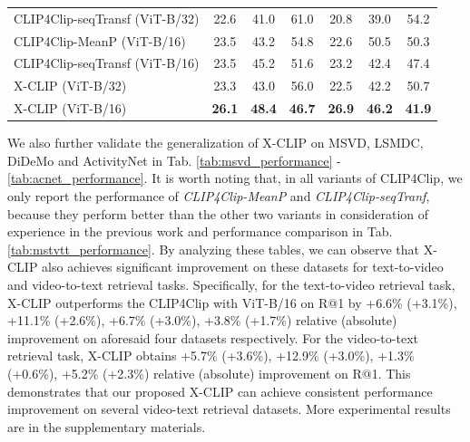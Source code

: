 \documentclass[sigconf]{acmart}
\begin{document}
\begin{table}[]
{\begin{tabular}{l|ccc|ccc}
 CLIP4Clip-seqTransf (ViT-B/32)  \cite{luo2021clip4clip} & 22.6 & 41.0 & 61.0 & 20.8 & 39.0 & 54.2 \\
CLIP4Clip-MeanP (ViT-B/16) \cite{luo2021clip4clip} & 23.5          & 43.2          & 54.8          & 22.6          & 50.5          & 50.3          \\ 
CLIP4Clip-seqTransf (ViT-B/16) \cite{luo2021clip4clip} & 23.5          & 45.2          & 51.6          & 23.2          & 42.4          & 47.4          \\ 
\hline
X-CLIP (ViT-B/32)    & 23.3          & 43.0          & 56.0          & 22.5          & 42.2          & 50.7          \\
X-CLIP (ViT-B/16)    & \textbf{26.1} & \textbf{48.4} & \textbf{46.7} & \textbf{26.9} & \textbf{46.2} & \textbf{41.9} \\ \hline
\end{tabular}
}
\vspace{-0.2cm}
\label{tab:lsmdc_performance}
\end{table}

We also further validate the generalization of X-CLIP on MSVD, LSMDC, DiDeMo and ActivityNet in Tab. \ref{tab:msvd_performance} - \ref{tab:acnet_performance}. It is worth noting that, in all variants of CLIP4Clip, we only report the performance of \emph{CLIP4Clip-MeanP} and \emph{CLIP4Clip-seqTranf}, because they perform better than the other two variants in consideration of experience in the previous work \cite{luo2021clip4clip} and performance comparison in Tab. \ref{tab:mstvtt_performance}. By analyzing these tables, we can observe that X-CLIP also achieves significant improvement on these datasets for text-to-video and video-to-text retrieval tasks. Specifically, for the text-to-video retrieval task, X-CLIP outperforms the CLIP4Clip with ViT-B/16 on R@1 by +6.6\% (+3.1\%), +11.1\% (+2.6\%), +6.7\% (+3.0\%), +3.8\% (+1.7\%) relative (absolute) improvement on aforesaid four datasets respectively. For the video-to-text retrieval task, X-CLIP obtains +5.7\% (+3.6\%), +12.9\% (+3.0\%), +1.3\% (+0.6\%), +5.2\% (+2.3\%) relative (absolute) improvement on R@1. This demonstrates that our proposed X-CLIP can achieve consistent performance improvement on several video-text retrieval datasets. More experimental results are in the supplementary materials. 
\end{document}
